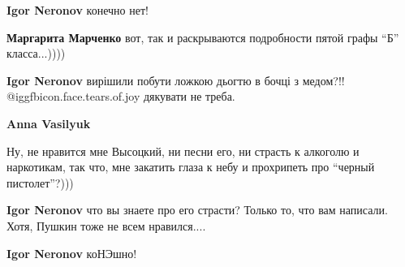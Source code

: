 \begin{itemize}
\begin{itemize}
\textbf{Igor Neronov} конечно нет!

\begin{itemize} %
\textbf{Маргарита Марченко} вот, так и раскрываются подробности пятой графы \enquote{Б} класса...))))

\textbf{Igor Neronov} вирішили побути ложкою дьогтю в бочці з медом?!! @igg{fbicon.face.tears.of.joy} дякувати не треба.

\textbf{Anna Vasilyuk} 

Ну, не нравится мне Высоцкий, ни песни его, ни страсть к алкоголю и наркотикам,
так что, мне закатить глаза к небу и прохрипеть про \enquote{черный пистолет}?)))

\textbf{Igor Neronov} что вы знаете про его страсти? Только то, что вам написали. Хотя, Пушкин тоже не всем нравился....

\textbf{Igor Neronov} коНЭшно!
\end{itemize} %

\end{itemize} %

\end{itemize} %

